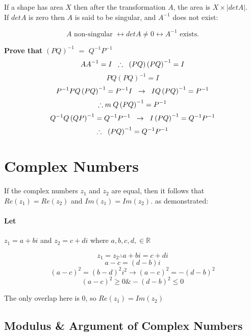 \documentclass{article}
\begin{document}
If a shape has area \(X\) then after the transformation \(A\), the area is \(X \times |detA|\). \\

If \(detA\) is zero then \(A\) is said to be singular, and \(A^{-1}\) does not exist:

\[\text{\(A\) non-singular } \leftrightarrow detA\neq 0 \leftrightarrow A^{-1} \text{ exists.}\]

\textbf{Prove that} \(\left(PQ\right)^{-1}\) \(=\) \(Q^{-1}P^{-1}\)
\[AA^{-1}=I \hspace{0.2cm} \therefore \hspace{0.2cm} \left(PQ\right)\left(PQ\right)^{-1}=I\]
\[PQ\left(PQ\right)^{-1}=I\]
\[P^{-1}PQ\left(PQ\right)^{-1}=P^{-1}I \hspace{0.2cm} \rightarrow \hspace{0.2cm} IQ\left(PQ\right)^{-1}=P^{-1}\]
\[\therefore \hspace{0.2ccm} Q\left(PQ\right)^{-1}=P^{-1}\]
\[Q^{-1}Q\left(QP\right)^{-1}=Q^{-1}P^{-1} \hspace{0.2cm} \rightarrow \hspace{0.2cm} I\left(PQ\right)^{-1}=Q^{-1}P^{-1}\]
\[\therefore \hspace{0.2cm} \left(PQ\right)^{-1}=Q^{-1}P^{-1}\]

\section{Complex Numbers}

If the complex numbers \(z_1\) and \(z_2\) are equal, then it follows that \(Re\left(z_1\right) = Re\left(z_2\right)\) and \(Im\left(z_1\right) = Im\left(z_2\right)\). as demonstrated:

\paragraph{Let} \(z_1 = a+bi\) and \(z_2 = c+di\) where \(a,b,c,d, \in \mathbb{R}\)

\[z_1 = z_2 \therefore a+bi = c+di\]
\[a-c=\left(d-b\right)i\]
\[\left(a-c\right)^2=\left(b-d\right)^2i^2 \rightarrow \left(a-c\right)^2=-\left(d-b\right)^2\]
\[\left(a-c\right)^2\geq 0 \& -\left(d-b\right)^2\leq 0\]

\noindent The only overlap here is 0, so \(Re\left(z_1\right) = Im\left(z_2\right)\)

\subsection{Modulus \& Argument of Complex Numbers}
\end{document}
